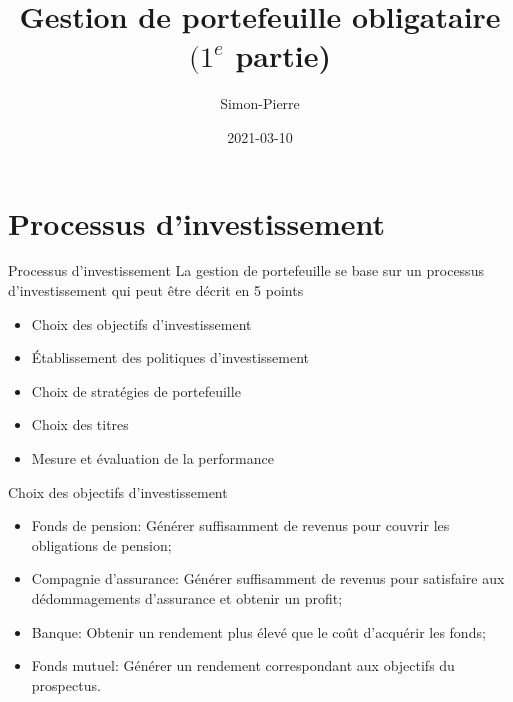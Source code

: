 \documentclass[10pt,a4paper]{beamer}
\title{Gestion de portefeuille obligataire \\ $(1^{e}$ partie)}
\date{2021-03-10}
\author{Simon-Pierre}
\institute{Université Laval}
\begin{document}
\begin{frame}
\titlepage
\end{frame}

\begin{frame}
\tableofcontents
\end{frame}


\section{Processus d'investissement}

\begin{frame}{Processus d’investissement}
La gestion de portefeuille se base sur un processus d’investissement qui peut être décrit en 5 points
\begin{itemize}[label=\bullet]
\item Choix des objectifs d’investissement
\item Établissement des politiques d’investissement
\item Choix de stratégies de portefeuille
\item Choix des titres
\item Mesure et évaluation de la performance
\end{itemize}
\end{frame}

\begin{frame}{Choix des objectifs d’investissement}
\begin{itemize}[label=\bullet]
\item Fonds de pension: Générer suffisamment de revenus pour couvrir les obligations de pension;
\item Compagnie d’assurance: Générer suffisamment de revenus pour satisfaire aux dédommagements d’assurance et obtenir un profit;
\item Banque: Obtenir un rendement plus élevé que le coût d’acquérir les fonds;
\item Fonds mutuel: Générer un rendement correspondant aux objectifs du prospectus.
\end{itemize}
\end{frame}
\end{document}
